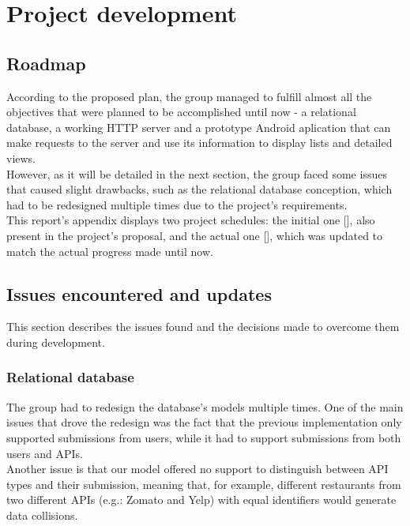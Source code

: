 %
%
\chapter{Project development}
    
	\section{Roadmap}

    According to the proposed plan, the group managed to fulfill almost all the objectives
    that were planned to be accomplished until now - a relational database, a working HTTP server
    and a prototype Android aplication that can make requests to the server and 
    use its information to display lists and detailed views.\\

    However, as it will be detailed in the next section, the group faced some issues that caused slight
    drawbacks, such as the relational database conception, which had to be redesigned multiple
    times due to the project's requirements.\\

    This report's appendix displays two project schedules: the initial one [], also present in the
    project's proposal, and the actual one [], which was updated to match the 
    actual progress made until now.


    \section{Issues encountered and updates}

    This section describes the issues found and the decisions made
    to overcome them during development.
    
    \subsection{Relational database}

    The group had to redesign the database's models multiple times.
    One of the main issues that drove the redesign was the fact that the previous implementation 
    only supported submissions from users, while it had to support submissions from both users and APIs.\\

    Another issue is that our model offered no support to distinguish between API types and their submission, meaning that,
    for example, different restaurants from two different APIs (e.g.: Zomato and Yelp) with equal identifiers would generate data collisions.\\

